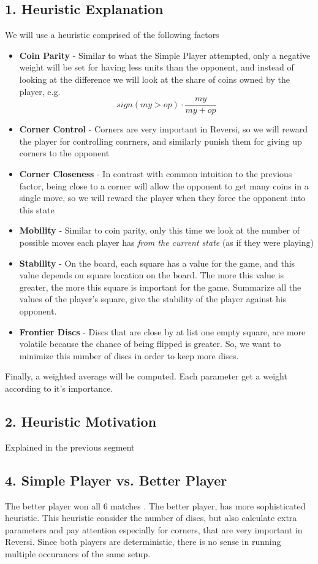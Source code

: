 \documentclass{article}
\begin{document}
\subsection*{1. Heuristic Explanation}
We will use a heuristic comprised of the following factors
\begin{itemize}
\item \textbf{Coin Parity} - Similar to what the Simple Player attempted, only a negative weight will be set for having less units than the opponent, and instead of looking at the difference we will look at the share of coins owned by the player, e.g.
$$
	sign(my > op) \cdot \frac {my}{my + op}
$$
\item \textbf{Corner Control} - Corners are very important in Reversi, so we will reward the player for controlling conrners, and similarly punish them for giving up corners to the opponent
\item \textbf{Corner Closeness} - In contrast with common intuition to the previous factor, being close to a corner will allow the opponent to get many coins in a single move, so we will reward the player when they force the opponent into this state
\item \textbf{Mobility} - Similar to coin parity, only this time we look at the number of possible moves each player has \emph{from the current state} (as if they were playing)
\item \textbf{Stability} - On the board, each square has a value for the game, and this value depends on square location on the board. The more this value is greater, the more this square is important for the game. Summarize all the values of the player's square, give the stability of the player against his opponent.
\item \textbf{Frontier Discs} - Discs that are close by at list one empty square, are more volatile because the chance of being flipped is greater. So, we want to minimize this number of discs in order to keep more discs.
\end{itemize}


Finally, a weighted average will be computed. Each parameter get a weight according to it's importance.

\subsection*{2. Heuristic Motivation}
Explained in the previous segment

\subsection*{4. Simple Player vs. Better Player}
The better player won all 6 matches .
The better player, has more sophisticated heuristic. This heuristic consider the number of discs, but also calculate extra parameters and pay attention especially for corners, that are very important in Reversi.
Since both players are deterministic, there is no sense in running multiple occurances of the same setup.
\end{document}

